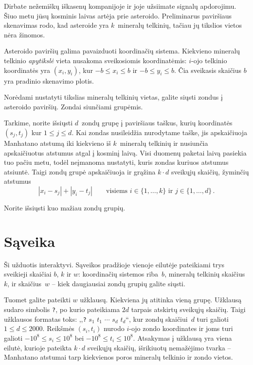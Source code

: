 

\noindent
Dirbate nežemiškų iškasenų kompanijoje ir joje užsiimate signalų apdorojimu. 
Šiuo metu jūsų kosminis laivas artėja prie asteroido.
Preliminarus paviršiaus skenavimas rodo, kad asteroide yra $k$~mineralų telkinių, tačiau jų tikslios vietos nėra žinomos.

\medskip

Asteroido paviršių galima pavaizduoti koordinačių sistema.
Kiekvieno mineralų telkinio \textit{apytikslė} vieta nusakoma sveikosiomis koordinatėmis:
$i$-ojo telkinio koordinatės yra $(x_i, y_i)$, kur
$-b \le x_i \le b$ ir $-b\le y_i \le b$. %
Čia sveikasis skaičius $b$ yra pradinio skenavimo plotis.

Norėdami nustatyti tikslias mineralų telkinių vietas, galite siųsti zondus į asteroido paviršių.
Zondai siunčiami grupėmis.

Tarkime, norite išsiųsti $d$~zondų grupę į paviršiaus taškus, kurių koordinatės $(s_j,t_j)$ kur $1\leq j\leq d$.
Kai zondas nusileidžia nurodytame taške, 
jis apskaičiuoja Manhatano atstumą iki kiekvieno iš $k$~mineralų telkinių
ir nusiunčia apskaičiuotus atstumus atgal į kosminį laivą.
Visi duomenų paketai laivą pasiekia tuo pačiu metu, todėl neįmanoma nustatyti, kuris zondas kuriuos atstumus atsiuntė.
Taigi zondų grupė apskaičiuoja ir grąžina $k\cdot d$ sveikųjų skaičių, žyminčių atstumus
\[|x_i-s_j| + |y_i - t_j| \qquad\text{visiems } i \in \{1,\ldots,k\} \text{ ir } j \in\{ 1,\ldots,d\}\,.\]

Norite išsiųsti kuo mažiau zondų grupių.


\section*{Sąveika}

Ši užduotis interaktyvi.
Sąveikos pradžioje vienoje eilutėje pateikiami trys sveikieji skaičiai $b$, $k$ ir $w$:
koordinačių sistemos riba~$b$,
mineralų telkinių skaičius~$k$,
ir skaičius~$w$ -- kiek daugiausiai zondų grupių galite siųsti.

Tuomet galite pateikti $w$ užklausų. Kiekviena jų atitinka vieną grupę.
Užklausą sudaro simbolis \texttt{?}, po kurio pateikiama $2d$ tarpais atskirtų sveikųjų skaičių.
Taigi užklausos formatas toks: ,,\texttt{?} $s_1$ $t_1$ $\cdots$ $s_d$ $t_d$``, kur zondų skaičiui~$d$ turi galioti
$1\leq d\leq 2000$. %
Reikšmės $(s_i,t_i)$ nurodo $i$-ojo zondo koordinates ir joms turi galioti
$-10^8 \leq s_i \leq 10^8$ bei $-10^8 \leq t_i \leq 10^8$. %
Atsakymas į užklausą yra viena eilutė, kurioje pateikta $k \cdot d$ sveikųjų skaičių, išrikiuotų nemažėjimo tvarka -- 
Manhatano atstumai tarp kiekvienos poros mineralų telkinio ir zondo vietos.


